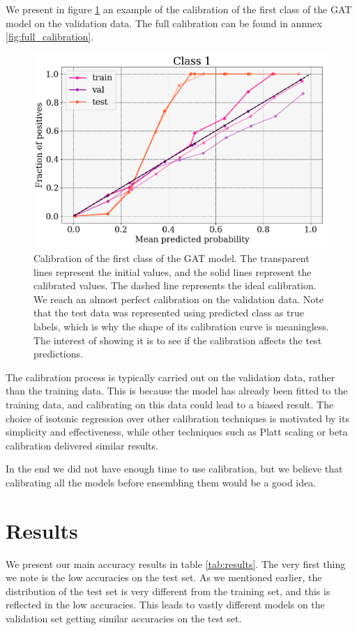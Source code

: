 \documentclass[switch, 11pt]{article}
\begin{document}
\begin{multicols}{2}
    We present in figure \ref{fig:calibration} an example of the calibration of the first class of the GAT model on the validation data. The full calibration can be found in annnex \ref{fig:full_calibration}.

    \begin{figure}[H]
        \centering
        \includegraphics[width=\columnwidth]{figures/small_calibration.png}
        \caption{Calibration of the first class of the GAT model. The transparent lines represent the initial values, and the solid lines represent the calibrated values. The dashed line represents the ideal calibration. We reach an almost perfect calibration on the validation data. Note that the test data was represented using predicted class as true labels, which is why the shape of its calibration curve is meaningless. The interest of showing it is to see if the calibration affects the test predictions.}
        \label{fig:calibration}
    \end{figure}

    The calibration process is typically carried out on the validation data, rather than the training data. This is because the model has already been fitted to the training data, and calibrating on this data could lead to a biased result. The choice of isotonic regression over other calibration techniques is motivated by its simplicity and effectiveness, while other techniques such as Platt scaling or beta calibration delivered similar results.

    In the end we did not have enough time to use calibration, but we believe that calibrating all the models before ensembling them would be a good idea.

    \section{Results}
    We present our main accuracy results in table \ref{tab:results}. The very first thing we note is the low accuracies on the test set. As we mentioned earlier, the distribution of the test set is very different from the training set, and this is reflected in the low accuracies. This leads to vastly different models on the validation set getting similar accuracies on the test set.


\end{multicols}
\end{document}
